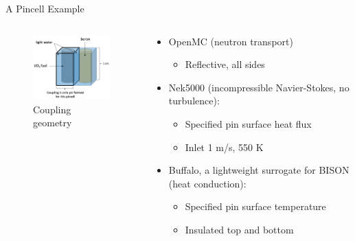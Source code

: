 \documentclass[10pt]{beamer}
\begin{document}
\begin{frame}{A Pincell Example}
\begin{columns}
\begin{column}{0.45\linewidth}
\begin{figure}
\includegraphics[width=5cm]{../Figures/pincell_picture.png}
\caption{Coupling geometry}
\end{figure}
\end{column}
\begin{column}{0.525\linewidth}
\begin{itemize}
\item OpenMC (neutron transport)
	\begin{itemize}
	\item Reflective, all sides\newline
	\end{itemize}
\item Nek5000 (incompressible Navier-Stokes, no turbulence):
	\begin{itemize}
	\item Specified pin surface heat flux
	\item Inlet 1 m/s, 550 K\newline
	\end{itemize}
\item Buffalo, a lightweight surrogate for BISON (heat conduction):
	\begin{itemize}
	\item Specified pin surface temperature
	\item Insulated top and bottom
	\end{itemize}
\end{itemize}
\end{column}
\end{columns}

\end{frame}
\end{document}
